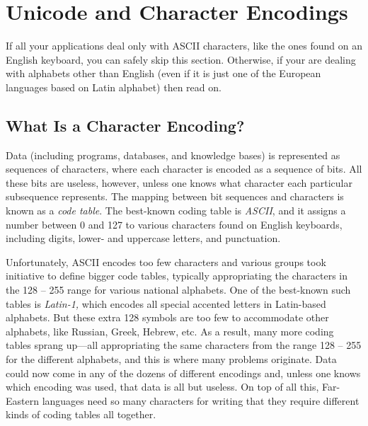 \documentclass[11pt]{article}
\begin{document}




\section{Unicode and Character Encodings}

If all your applications deal only with ASCII characters, like the ones
found on an English keyboard, you can safely skip this
section. Otherwise, if your are dealing with alphabets other than English
(even if it is just one of the European languages based on Latin alphabet)
then read on.

\subsection{What Is a Character Encoding?}

Data (including programs, databases, and knowledge bases) is represented as
sequences of characters, where each character is encoded as a sequence of bits.
All these bits are useless, however, unless one knows what character each
particular subsequence represents. The mapping between bit sequences and
characters is known as a \emph{code table}. The best-known coding table
is \emph{ASCII}, and it assigns a number between 0 and 127 to various
characters found on English keyboards, including digits,
lower- and uppercase letters, and punctuation.

Unfortunately, ASCII encodes too few characters and various groups took
initiative to define bigger code tables, typically appropriating the
characters in the 128 -- 255 range for various national alphabets. One of
the best-known such tables is \emph{Latin-1,}
which encodes all special accented letters in Latin-based alphabets.
But these extra 128 symbols are too few to accommodate other alphabets,
like Russian, Greek, Hebrew, etc. As a result, many more coding tables
sprang up---all appropriating the same characters from the range 128 -- 255
for the different alphabets, and this is where many problems originate.
Data could now come in any of the dozens of different encodings and, unless
one knows which encoding was used, that data is all but useless.
On top of all this, Far-Eastern languages need so many characters for
writing that they require different kinds of coding tables all together.
\end{document}
